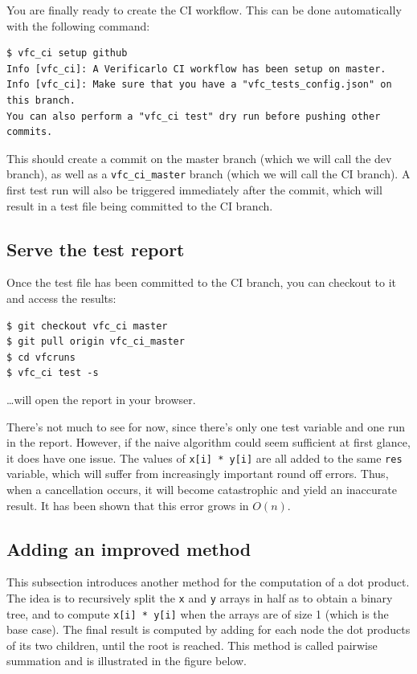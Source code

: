 You are finally ready to create the CI workflow. This can be done automatically with the following command:

\begin{verbatim}
$ vfc_ci setup github
Info [vfc_ci]: A Verificarlo CI workflow has been setup on master.
Info [vfc_ci]: Make sure that you have a "vfc_tests_config.json" on this branch.
You can also perform a "vfc_ci test" dry run before pushing other commits.
\end{verbatim}

This should create a commit on the master branch (which we will call the dev
branch), as well as a \texttt{vfc_ci_master} branch (which we will call the
CI branch). A first test run will also be triggered immediately after the
commit, which will result in a test file being committed to the CI branch.


\subsection{Serve the test report}

Once the test file has been committed to the CI branch, you can checkout to it and access the results:

\begin{verbatim}
$ git checkout vfc_ci master
$ git pull origin vfc_ci_master
$ cd vfcruns
$ vfc_ci test -s
\end{verbatim}

\dots will open the report in your browser.

There's not much to see for now, since there's only one test variable and one
run in the report. However, if the naive algorithm could seem sufficient at
first glance, it does have one issue. The values of \texttt{x[i] * y[i]}
are all added to the same \texttt{res} variable, which will suffer from increasingly
important round off errors. Thus, when a cancellation occurs, it will become
catastrophic and yield an inaccurate result. It has been shown that this error
grows in $O(n)$.


\subsection{Adding an improved method}

This subsection introduces another method for the computation of a dot product.
The idea is to recursively split the \texttt{x} and \texttt{y}
arrays in half as to obtain a binary tree, and to compute 
\texttt{x[i] * y[i]} when the arrays are of size 1 (which is the base
case). The final result is computed by adding for each node the dot products of
its two children, until the root is reached. This method is called pairwise
summation and is illustrated in the figure below.

